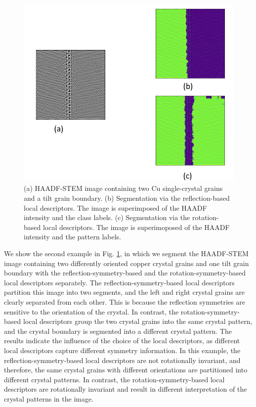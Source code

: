 \documentclass[twocolumn,amsmath, floatfix]{revtex4}
\begin{document}
\begin{figure}
    \centering
    \includegraphics[width=0.8\columnwidth]{Cu_grain_boundary.png}
    \caption{ (a) HAADF-STEM image containing two Cu single-crystal grains and a tilt grain boundary. (b) Segmentation via the reflection-based local descriptors. The image is superimposed of the HAADF intensity and the class labels. (c) Segmentation via the rotation-based local descriptors. The image is superimoposed of the HAADF intensity and the pattern labels.   }
    \label{fig:Cu_grain_boundary}
\end{figure}

We show the second example in Fig. \ref{fig:Cu_grain_boundary}, in which we segment the HAADF-STEM image containing two differently oriented copper crystal grains and one tilt grain boundary with the reflection-symmetry-based and the rotation-symmetry-based local descriptors separately. The reflection-symmetry-based local descriptors partition this image into two segments, and the left and right crystal grains are clearly separated from each other. This is because the reflection symmetries are sensitive to the orientation of the crystal. In contrast,  the rotation-symmetry-based local descriptors group the two crystal grains into the same crystal pattern, and the crystal boundary is segmented into a different crystal pattern. 
The results indicate the influence of the choice of the local descriptors, as different local descriptors capture different symmetry information. In this example, the reflection-symmetry-based local descriptors are not rotationally invariant, and therefore, the same crystal grains with different orientations are partitioned into different crystal patterns. In contrast, the rotation-symmetry-based local descriptors are rotationally invariant and result in different interpretation of the crystal patterns in the image.
\end{document}
